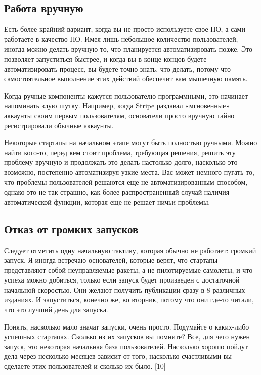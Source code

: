 \documentclass[ebook,12pt,oneside,openany]{memoir}
\begin{document}
\subsection{Работа вручную}

Есть более крайний вариант, когда вы не просто используете свое ПО, а
сами работаете в качество ПО. Имея лишь небольшое количество
пользователей, иногда можно делать вручную то, что планируется
автоматизировать позже. Это позволяет запуститься быстрее, и когда вы
в конце концов будете автоматизировать процесс, вы будете точно знать,
что делать, потому что самостоятельное выполнение этих действий
обеспечит вам мышечную память. \newline

Когда ручные компоненты кажутся пользователю программными, это
начинает напоминать злую шутку. Например, когда Stripe раздавал
«мгновенные» аккаунты своим первым пользователям, основатели просто
вручную тайно регистрировали обычные аккаунты. \newline

Некоторые стартапы на начальном этапе могут быть полностью ручными.
Можно найти кого-то, перед кем стоит проблема, требующая решения,
решить эту проблему вручную и продолжать это делать настолько долго,
насколько это возможно, постепенно автоматизируя узкие места. Вас
может немного пугать то, что проблемы пользователей решаются еще не
автоматизированным способом, однако это не так страшно, как более
распространенный случай наличия автоматической функции, которая еще не
решает ничьи проблемы. \newline

\subsection{Отказ от громких запусков}

Следует отметить одну начальную тактику, которая обычно не работает:
громкий запуск. Я иногда встречаю основателей, которые верят, что
стартапы представляют собой неуправляемые ракеты, а не пилотируемые
самолеты, и что успеха можно добиться, только если запуск будет
произведен с достаточной начальной скоростью. Они желают получить
публикации сразу в 8 различных изданиях. И запуститься, конечно же, во
вторник, потому что они где-то читали, что это лучший день для
запуска. \newline

Понять, насколько мало значат запуски, очень просто. Подумайте о
каких-либо успешных стартапах. Сколько из их запусков вы помните? Все,
для чего нужен запуск, это некоторая начальная база пользователей.
Насколько хорошо пойдут дела через несколько месяцев зависит от того,
насколько счастливыми вы сделаете этих пользователей и сколько их
было. [10] \newline
\end{document}
